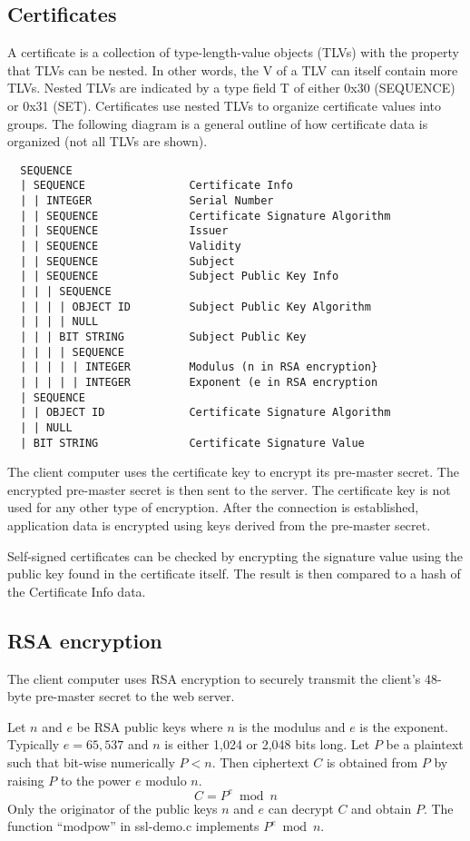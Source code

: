 \documentclass[11pt]{article}
\begin{document}
\subsection*{Certificates}
A certificate is a collection of type-length-value objects (TLVs) with the
property that TLVs can be nested.
In other words, the V of a TLV can itself contain more TLVs.
Nested TLVs are indicated by a type field T of either 0x30 (SEQUENCE)
or 0x31 (SET).
Certificates use nested TLVs to organize certificate values
into groups.
The following diagram is a general outline of how certificate data is organized
(not all TLVs are shown).

\begin{lstlisting}
  SEQUENCE
  | SEQUENCE                Certificate Info
  | | INTEGER               Serial Number
  | | SEQUENCE              Certificate Signature Algorithm
  | | SEQUENCE              Issuer
  | | SEQUENCE              Validity
  | | SEQUENCE              Subject
  | | SEQUENCE              Subject Public Key Info
  | | | SEQUENCE
  | | | | OBJECT ID         Subject Public Key Algorithm
  | | | | NULL
  | | | BIT STRING          Subject Public Key
  | | | | SEQUENCE
  | | | | | INTEGER         Modulus (n in RSA encryption}
  | | | | | INTEGER         Exponent (e in RSA encryption
  | SEQUENCE
  | | OBJECT ID             Certificate Signature Algorithm
  | | NULL
  | BIT STRING              Certificate Signature Value
\end{lstlisting}

The client computer uses the certificate key to encrypt its pre-master
secret.
The encrypted pre-master secret is then sent to the server.
The certificate key is not used for any other type of encryption.
After the connection is established, application data is encrypted using
keys derived from the pre-master secret.

Self-signed certificates can be checked by encrypting the signature value
using the public key found in the certificate itself.
The result is then compared to a hash of the Certificate Info data.

\subsection*{RSA encryption}
The client computer
uses RSA encryption to securely transmit the client's
48-byte pre-master secret to the web server.

Let $n$ and $e$ be RSA public keys where $n$ is the modulus and $e$
is the exponent.
Typically $e=65,537$ and $n$ is either 1,024 or 2,048 bits long.
Let $P$ be a plaintext such that bit-wise numerically $P<n$.
Then ciphertext $C$ is obtained from $P$ by raising $P$ to the
power $e$ modulo $n$.
$$C=P^e\bmod n$$
Only the originator of the public keys $n$ and $e$ can decrypt
$C$ and obtain $P$.
The function ``modpow'' in ssl-demo.c implements $P^e\bmod n$.
\end{document}
